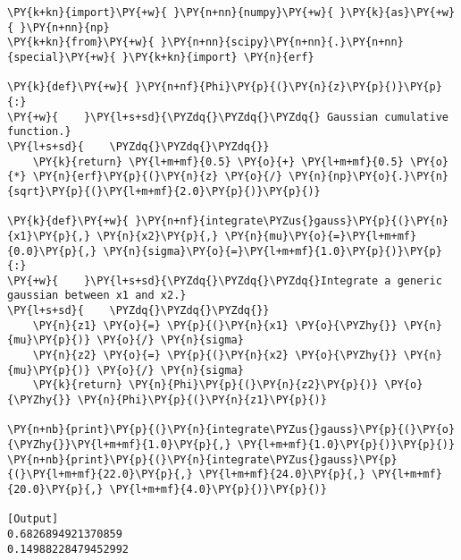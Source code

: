 \begin{Verbatim}[label=\makebox{\href{https://github.com/unipi-physics-labs/statnotes/tree/main/snippy/erf.py}{https://github.com/.../erf.py}},commandchars=\\\{\}]
\PY{k+kn}{import}\PY{+w}{ }\PY{n+nn}{numpy}\PY{+w}{ }\PY{k}{as}\PY{+w}{ }\PY{n+nn}{np}
\PY{k+kn}{from}\PY{+w}{ }\PY{n+nn}{scipy}\PY{n+nn}{.}\PY{n+nn}{special}\PY{+w}{ }\PY{k+kn}{import} \PY{n}{erf}

\PY{k}{def}\PY{+w}{ }\PY{n+nf}{Phi}\PY{p}{(}\PY{n}{z}\PY{p}{)}\PY{p}{:}
\PY{+w}{    }\PY{l+s+sd}{\PYZdq{}\PYZdq{}\PYZdq{} Gaussian cumulative function.}
\PY{l+s+sd}{    \PYZdq{}\PYZdq{}\PYZdq{}}
    \PY{k}{return} \PY{l+m+mf}{0.5} \PY{o}{+} \PY{l+m+mf}{0.5} \PY{o}{*} \PY{n}{erf}\PY{p}{(}\PY{n}{z} \PY{o}{/} \PY{n}{np}\PY{o}{.}\PY{n}{sqrt}\PY{p}{(}\PY{l+m+mf}{2.0}\PY{p}{)}\PY{p}{)}

\PY{k}{def}\PY{+w}{ }\PY{n+nf}{integrate\PYZus{}gauss}\PY{p}{(}\PY{n}{x1}\PY{p}{,} \PY{n}{x2}\PY{p}{,} \PY{n}{mu}\PY{o}{=}\PY{l+m+mf}{0.0}\PY{p}{,} \PY{n}{sigma}\PY{o}{=}\PY{l+m+mf}{1.0}\PY{p}{)}\PY{p}{:}
\PY{+w}{    }\PY{l+s+sd}{\PYZdq{}\PYZdq{}\PYZdq{}Integrate a generic gaussian between x1 and x2.}
\PY{l+s+sd}{    \PYZdq{}\PYZdq{}\PYZdq{}}
    \PY{n}{z1} \PY{o}{=} \PY{p}{(}\PY{n}{x1} \PY{o}{\PYZhy{}} \PY{n}{mu}\PY{p}{)} \PY{o}{/} \PY{n}{sigma}
    \PY{n}{z2} \PY{o}{=} \PY{p}{(}\PY{n}{x2} \PY{o}{\PYZhy{}} \PY{n}{mu}\PY{p}{)} \PY{o}{/} \PY{n}{sigma}
    \PY{k}{return} \PY{n}{Phi}\PY{p}{(}\PY{n}{z2}\PY{p}{)} \PY{o}{\PYZhy{}} \PY{n}{Phi}\PY{p}{(}\PY{n}{z1}\PY{p}{)}

\PY{n+nb}{print}\PY{p}{(}\PY{n}{integrate\PYZus{}gauss}\PY{p}{(}\PY{o}{\PYZhy{}}\PY{l+m+mf}{1.0}\PY{p}{,} \PY{l+m+mf}{1.0}\PY{p}{)}\PY{p}{)}
\PY{n+nb}{print}\PY{p}{(}\PY{n}{integrate\PYZus{}gauss}\PY{p}{(}\PY{l+m+mf}{22.0}\PY{p}{,} \PY{l+m+mf}{24.0}\PY{p}{,} \PY{l+m+mf}{20.0}\PY{p}{,} \PY{l+m+mf}{4.0}\PY{p}{)}\PY{p}{)}

[Output]
0.6826894921370859
0.14988228479452992
\end{Verbatim}
